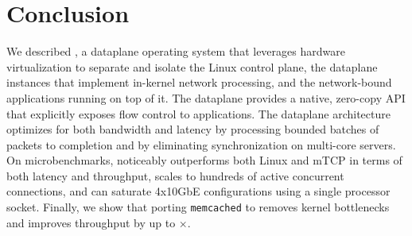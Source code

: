 
\section{Conclusion}

We described \ix, a dataplane operating system that leverages hardware
virtualization to separate and isolate the Linux control plane, the
\ix dataplane instances that implement in-kernel network processing,
and the network-bound applications running on top of it.  The \ix
dataplane provides a native, zero-copy API that explicitly exposes
flow control to applications. The dataplane architecture optimizes for
both bandwidth and latency by processing bounded batches of packets to
completion and by eliminating synchronization on multi-core
servers. On microbenchmarks, \ix noticeably outperforms both Linux and
mTCP in terms of both latency and throughput, scales to hundreds of
active concurrent connections, and can saturate 4x10GbE configurations
using a single processor socket.  Finally, we show that porting
\texttt{memcached} to \ix removes kernel bottlenecks and improves
throughput by up to $\times$.



